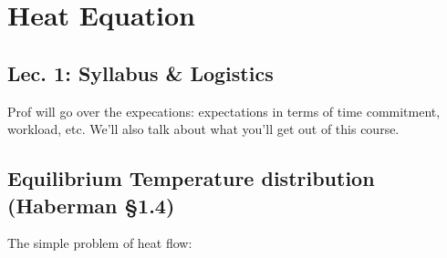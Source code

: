 \chapter{Heat Equation}

\section{Lec. 1: Syllabus \& Logistics}
Prof will go over the expecations: expectations in terms of time commitment, workload, etc. We'll also talk about what you'll get out of this course.

\section{Equilibrium Temperature distribution (Haberman \S 1.4)}

The simple problem of heat flow: 

